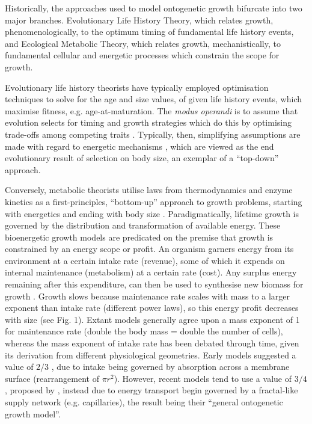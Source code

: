 \documentclass[a4paper]{article} %
\begin{document}
\begin{center}
\begin{minipage}{\linewidth}
    Historically, the approaches used to model ontogenetic growth bifurcate into two major branches. Evolutionary Life History Theory, which relates growth, phenomenologically, to the optimum timing of fundamental life history events, and Ecological Metabolic Theory, which relates growth, mechanistically, to fundamental cellular and energetic processes which constrain the scope for growth.
        
    Evolutionary life history theorists have typically employed optimisation techniques to solve for the age and size values, of given life history events, which maximise fitness, e.g. age-at-maturation. The \textit{modus operandi} is to assume that evolution selects for timing and growth strategies which do this by optimising trade-offs among competing traits \autocite{Day1997, Stearns1989, stearns1992evolution}. Typically, then, simplifying assumptions are made with regard to energetic mechanisms \autocite{Day1997, Kozowski1987-indeterminate}, which are viewed as the end evolutionary result of selection on body size, an exemplar of a ``top-down'' approach.
        
    Conversely, metabolic theorists utilise laws from thermodynamics and enzyme kinetics as a first-principles, ``bottom-up'' approach to growth problems, starting with energetics and ending with body size \autocite{Brown2004}. Paradigmatically, lifetime growth is governed by the distribution and transformation of available energy. These bioenergetic growth models are predicated on the premise that growth is constrained by an energy scope or profit. An organism garners energy from its environment at a certain intake rate (revenue), some of which it expends on internal maintenance (metabolism) at a certain rate (cost). Any surplus energy remaining after this expenditure, can then be used to synthesise new biomass for growth \autocite{Holdway1984, Rochet2001, Enberg2012, VanGemert2019}. Growth slows because maintenance rate scales with mass to a larger exponent than intake rate (different power laws), so this energy profit decreases with size (see Fig. 1). Extant models generally agree upon a mass exponent of 1 for maintenance rate (double the body mass = double the number of cells), whereas the mass exponent of intake rate has been debated through time, given its derivation from different physiological geometries. Early models suggested a value of $2/3$ \autocite{Putter1920,vonBert1938, VonBertalanffy1957}, due to intake being governed by absorption across a membrane surface (rearrangement of $\pi r^2$). However, recent models tend to use a value of $3/4$, proposed by \textcite{West1997}, instead due to energy transport begin governed by a fractal-like supply network (e.g. capillaries), the result being their ``general ontogenetic growth model''.


\end{minipage}
\end{center}
\end{document}
